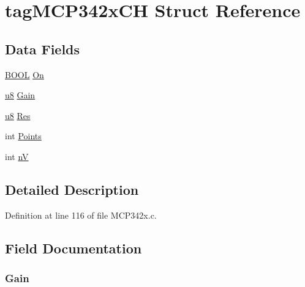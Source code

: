 \hypertarget{structtag_m_c_p342x_c_h}{\section{tag\-M\-C\-P342x\-C\-H Struct Reference}
\label{structtag_m_c_p342x_c_h}
}
\subsection*{Data Fields}
\begin{DoxyCompactItemize}
\item 
\hyperlink{p8_2pinguino_2core_2typedef_8h_a67bb6a3d7ee6a2a5950ce437abbe31c8}{B\-O\-O\-L} \hyperlink{structtag_m_c_p342x_c_h_a2d1f06ea4f608600e241eeded488b0df}{On}
\item 
\hyperlink{p8_2pinguino_2core_2typedef_8h_aed742c436da53c1080638ce6ef7d13de}{u8} \hyperlink{structtag_m_c_p342x_c_h_af6edf66b290ce5c676f8fc96531593cd}{Gain}
\item 
\hyperlink{p8_2pinguino_2core_2typedef_8h_aed742c436da53c1080638ce6ef7d13de}{u8} \hyperlink{structtag_m_c_p342x_c_h_a8573f92bdf8f12f4d330c68aee4ce26a}{Res}
\item 
int \hyperlink{structtag_m_c_p342x_c_h_a4e6fa56ee9cc8075628f24656cbe03ba}{Points}
\item 
int \hyperlink{structtag_m_c_p342x_c_h_affe84419e6828165e18a52d724db74fd}{n\-V}
\end{DoxyCompactItemize}


\subsection{Detailed Description}


Definition at line 116 of file M\-C\-P342x.\-c.



\subsection{Field Documentation}
\hypertarget{structtag_m_c_p342x_c_h_af6edf66b290ce5c676f8fc96531593cd}{
\subsubsection[{Gain}]{ Gain}}\label{structtag_m_c_p342x_c_h_af6edf66b290ce5c676f8fc96531593cd}


